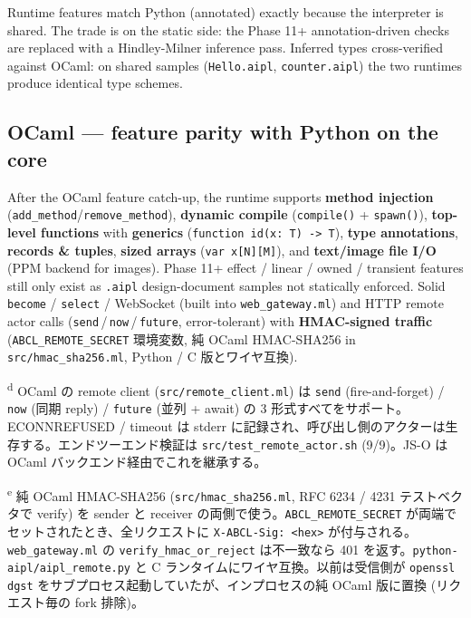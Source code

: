 \documentclass[10pt,a4paper,landscape]{article}
\begin{document}
Runtime features match Python (annotated) exactly because the
interpreter is shared.  The trade is on the static side: the Phase
11+ annotation-driven checks are replaced with a Hindley-Milner
inference pass.  Inferred types cross-verified against OCaml: on
shared samples (\texttt{Hello.aipl}, \texttt{counter.aipl}) the two
runtimes produce identical type schemes.

\subsection*{OCaml --- feature parity with Python on the core}

After the OCaml feature catch-up, the runtime supports
\textbf{method injection} (\texttt{add\_method}/\texttt{remove\_method}),
\textbf{dynamic compile} (\texttt{compile()} + \texttt{spawn()}),
\textbf{top-level functions} with \textbf{generics}
(\texttt{function id(x: T) -> T}), \textbf{type annotations},
\textbf{records \& tuples}, \textbf{sized arrays}
(\texttt{var x[N][M]}), and \textbf{text/image file I/O} (PPM
backend for images).  Phase 11+ effect / linear / owned / transient
features still only exist as \texttt{.aipl} design-document samples
\textemdash{} not statically enforced.  Solid \texttt{become} /
\texttt{select} / WebSocket (built into \texttt{web\_gateway.ml})
and HTTP remote actor calls (\texttt{send}\,/\,\texttt{now}\,/\,\texttt{future},
error-tolerant) with \textbf{HMAC-signed traffic}
(\texttt{ABCL\_REMOTE\_SECRET} 環境変数, 純 OCaml HMAC-SHA256 in
\texttt{src/hmac\_sha256.ml}, Python / C 版とワイヤ互換).

\textsuperscript{d} \small OCaml の remote client (\texttt{src/remote\_client.ml}) は \texttt{send} (fire-and-forget) / \texttt{now} (同期 reply) / \texttt{future} (並列 + await) の 3 形式すべてをサポート。ECONNREFUSED / timeout は stderr に記録され、呼び出し側のアクターは生存する。エンドツーエンド検証は \texttt{src/test\_remote\_actor.sh} (9/9)。JS-O は OCaml バックエンド経由でこれを継承する。

\textsuperscript{e} \small 純 OCaml HMAC-SHA256 (\texttt{src/hmac\_sha256.ml}, RFC 6234 / 4231 テストベクタで verify) を sender と receiver の両側で使う。\texttt{ABCL\_REMOTE\_SECRET} が両端でセットされたとき、全リクエストに \texttt{X-ABCL-Sig: <hex>} が付与される。\texttt{web\_gateway.ml} の \texttt{verify\_hmac\_or\_reject} は不一致なら 401 を返す。\texttt{python-aipl/aipl\_remote.py} と C ランタイムにワイヤ互換。以前は受信側が \texttt{openssl dgst} をサブプロセス起動していたが、インプロセスの純 OCaml 版に置換 (リクエスト毎の fork 排除)。
\end{document}
